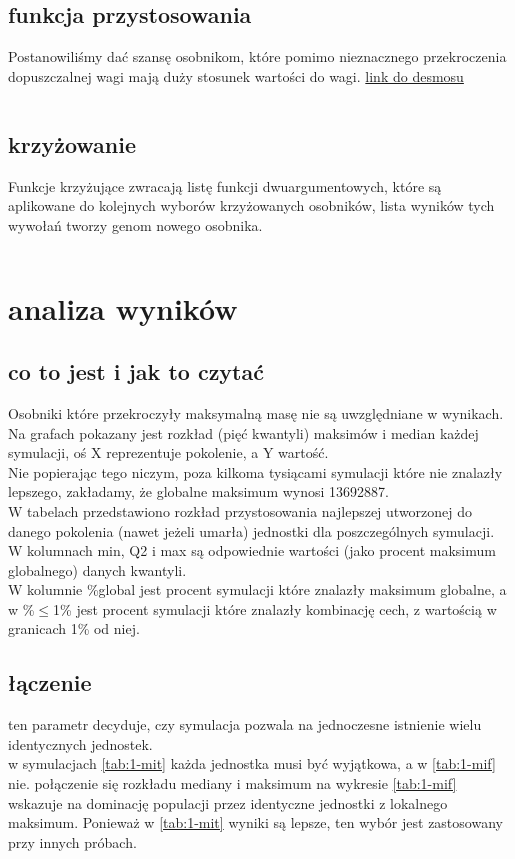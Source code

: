 \documentclass{article}
\begin{document}
\subsection{funkcja przystosowania}
Postanowiliśmy dać szansę osobnikom, które pomimo nieznacznego przekroczenia dopuszczalnej
wagi mają duży stosunek wartości do wagi.
\href{https://www.desmos.com/calculator/gikud1m6v8}{link do desmosu}
\inputminted{clojure}{snippets/alg.clj_scoring}
\subsection{krzyżowanie}
Funkcje krzyżujące zwracają listę funkcji dwuargumentowych, które są aplikowane
do kolejnych wyborów krzyżowanych osobników, lista wyników tych wywołań tworzy
genom nowego osobnika.
\inputminted{clojure}{snippets/alg.clj_krzyżowanie}



\section{analiza wyników}
\subsection{co to jest i jak to czytać}
Osobniki które przekroczyły maksymalną masę nie są uwzględniane w wynikach.
\\
Na grafach pokazany jest rozkład (pięć kwantyli) maksimów i median każdej
symulacji, oś X reprezentuje pokolenie, a Y wartość.
\\
Nie popierając tego niczym, poza kilkoma tysiącami symulacji które nie znalazły
lepszego, zakładamy, że globalne maksimum wynosi 13692887.
\\
W tabelach przedstawiono rozkład przystosowania najlepszej utworzonej do danego pokolenia
(nawet jeżeli umarła) jednostki dla poszczególnych symulacji.
\\
W kolumnach min, Q2 i max są odpowiednie wartości (jako procent maksimum
globalnego) danych kwantyli.
\\
W kolumnie \%global jest procent symulacji które znalazły maksimum globalne, a
w \%$\le$1\% jest procent symulacji które znalazły kombinację cech, z wartością w
granicach 1\% od niej.

\subsection{łączenie}
ten parametr decyduje, czy symulacja pozwala na jednoczesne istnienie wielu
identycznych jednostek.\\
w symulacjach \ref{tab:1-mit} każda jednostka musi być wyjątkowa, a w
\ref{tab:1-mif} nie. połączenie się rozkładu mediany i maksimum na wykresie
\ref{tab:1-mif} wskazuje na dominację populacji przez identyczne jednostki
z lokalnego maksimum. Ponieważ w \ref{tab:1-mit} wyniki są lepsze, ten wybór
jest zastosowany przy innych próbach.
\end{document}
